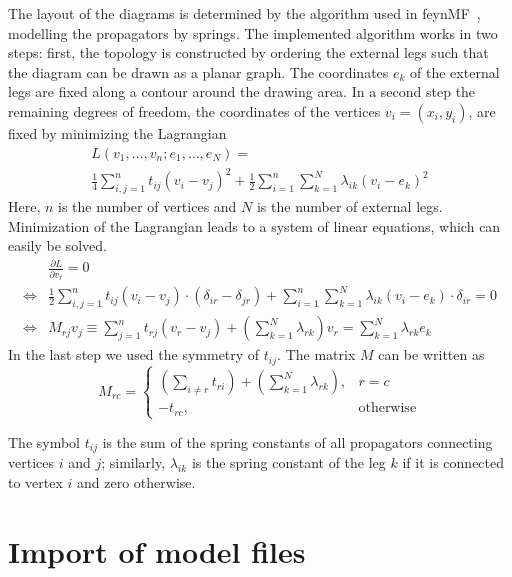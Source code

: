 \documentclass[11pt,a4paper]{refrep}
\begin{document}
The layout of the diagrams is determined by the algorithm used in
\textsf{feynMF}~\cite{Ohl:1995kr}, modelling the propagators by springs.
The implemented algorithm works in two steps: first, the topology is
constructed by ordering the external legs such that the diagram can
be drawn as a planar graph. The coordinates $e_k$
of the external legs are
fixed along a contour around the drawing area.
In a second step the remaining degrees of freedom, the coordinates
of the vertices $v_i=(x_i, y_i)$, are fixed by minimizing the Lagrangian
\begin{multline}
L(v_1, \ldots, v_n; e_1, \ldots, e_N) =\\
 \frac14\sum_{i,j=1}^n t_{ij}\left(v_i-v_j\right)^2
+\frac12\sum_{i=1}^n\sum_{k=1}^N\lambda_{ik}\left(v_i-e_k\right)^2
\end{multline}
Here, $n$ is the number of vertices and $N$ is the number of external
legs.
Minimization of the Lagrangian leads to a system of linear equations, which
can easily be solved.
\begin{align*}
&\frac{\partial L}{\partial v_r}=0\\
\Leftrightarrow&
 \frac12\sum_{i,j=1}^n t_{ij}\left(v_i-v_j\right)
     \cdot\left(\delta_{ir}-\delta_{jr}\right)
+\sum_{i=1}^n\sum_{k=1}^N\lambda_{ik}\left(v_i-e_k\right)
     \cdot\delta_{ir}=0\\
\Leftrightarrow&
M_{rj}v_j\equiv
 \sum_{j=1}^n t_{rj}\left(v_r-v_j\right)
+\left(\sum_{k=1}^N\lambda_{rk}\right)v_r
=\sum_{k=1}^N\lambda_{rk}e_k
\end{align*}
In the last step we used the symmetry of $t_{ij}$.
The matrix $M$ can be written as
\begin{equation}
M_{rc}=\left\{\begin{array}{ll}
\left(\sum_{i\neq r}t_{ri}\right)+
\left(\sum_{k=1}^N\lambda_{rk}\right),&
r=c\\
-t_{rc},&\text{otherwise}
\end{array}\right.
\end{equation}

The symbol $t_{ij}$ is the sum of the spring constants of all
propagators connecting vertices $i$ and $j$; similarly, $\lambda_{ik}$
is the spring constant of the leg $k$ if it is connected to vertex $i$
and zero otherwise.

\section{Import of model files}
\label{sec:model}
\end{document}
